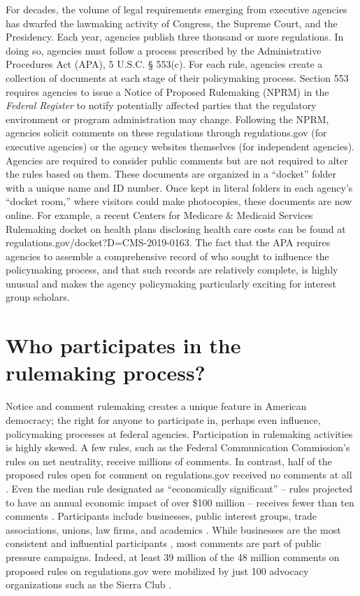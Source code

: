 \documentclass[
      12pt,
        ]{article}
\begin{document}
For decades, the volume of legal requirements emerging from executive
agencies has dwarfed the lawmaking activity of Congress, the Supreme
Court, and the Presidency. Each year, agencies publish three thousand or
more regulations. In doing so, agencies must follow a process prescribed
by the Administrative Procedures Act (APA), 5 U.S.C. § 553(c). For each
rule, agencies create a collection of documents at each stage of their
policymaking process. Section 553 requires agencies to issue a Notice of
Proposed Rulemaking (NPRM) in the \emph{Federal Register} to notify
potentially affected parties that the regulatory environment or program
administration may change. Following the NPRM, agencies solicit comments
on these regulations through regulations.gov (for executive agencies) or
the agency websites themselves (for independent agencies). Agencies are
required to consider public comments but are not required to alter the
rules based on them. These documents are organized in a ``docket''
folder with a unique name and ID number. Once kept in literal folders in
each agency's ``docket room,'' where visitors could make photocopies,
these documents are now online. For example, a recent Centers for
Medicare \& Medicaid Services Rulemaking docket on health plans
disclosing health care costs can be found at
regulations.gov/docket?D=CMS-2019-0163. The fact that the APA requires
agencies to assemble a comprehensive record of who sought to influence
the policymaking process, and that such records are relatively complete,
is highly unusual and makes the agency policymaking particularly
exciting for interest group scholars.

\hypertarget{who-participates-in-the-rulemaking-process}{%
\section{Who participates in the rulemaking
process?}\label{who-participates-in-the-rulemaking-process}}

Notice and comment rulemaking creates a unique feature in American
democracy; the right for anyone to participate in, perhaps even
influence, policymaking processes at federal agencies. Participation in
rulemaking activities is highly skewed. A few rules, such as the Federal
Communication Commission's rules on net neutrality, receive millions of
comments. In contrast, half of the proposed rules open for comment on
regulations.gov received no comments at all \citep{LibgoberJOP}. Even
the median rule designated as ``economically significant'' -- rules
projected to have an annual economic impact of over \$100 million --
receives fewer than ten comments \citep{judgelord2019SPSA}. Participants
include businesses, public interest groups, trade associations, unions,
law firms, and academics \citep{CuellarALR2005, YackeeJOP2006}. While
businesses are the most consistent and influential participants
\citep{YackeeJOP2006, LibgoberJOP}, most comments are part of public
pressure campaigns. Indeed, at least 39 million of the 48 million
comments on proposed rules on regulations.gov were mobilized by just 100
advocacy organizations such as the Sierra Club
\citep{judgelord2019SPSA}.
\end{document}
